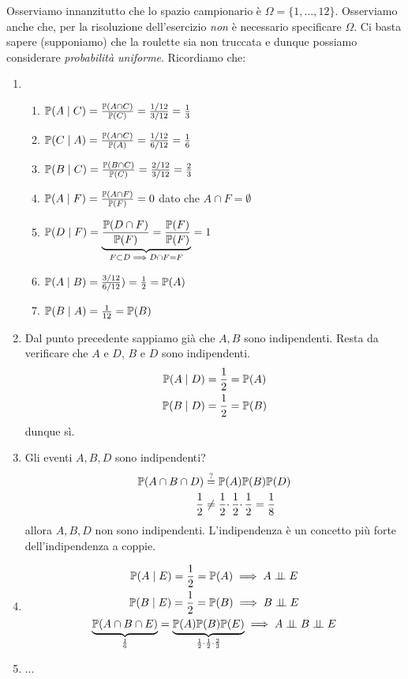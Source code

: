 Osserviamo innanzitutto che lo spazio campionario è $\Omega =\{1,\dots,12\}$. Osserviamo anche che, per la risoluzione dell'esercizio \textit{non} è necessario specificare $\Omega $. Ci basta sapere (supponiamo) che la roulette sia non truccata e dunque possiamo considerare \textit{probabilità uniforme}. Ricordiamo che:
\begin{enumerate}
	\item 
	\begin{enumerate}
		\item $\mathbb{P}( A\mid C) =\frac{\mathbb{P}( A\cap C)}{\mathbb{P}( C)} =\frac{1/12}{3/12} =\frac{1}{3}$
		\item $\mathbb{P}( C\mid A) =\frac{\mathbb{P}( A\cap C)}{\mathbb{P}( A)} =\frac{1/12}{6/12} =\frac{1}{6}$
		\item $\mathbb{P}( B\mid C) =\frac{\mathbb{P}( B\cap C)}{\mathbb{P}( C)} =\frac{2/12}{3/12} =\frac{2}{3}$
		\item $\mathbb{P}( A\mid F) =\frac{\mathbb{P}( A\cap F)}{\mathbb{P}( F)} =0$ dato che $A\cap F=\emptyset $
		\item $\mathbb{P}( D\mid F) =\underbrace{\frac{\mathbb{P}( D\cap F)}{\mathbb{P}( F)} =\frac{\mathbb{P}( F)}{\mathbb{P}( F)}}_{F\subset D\implies D\cap F=F} =1$
		\item $\mathbb{P}( A\mid B) =\frac{3/12}{6/12}) =\frac{1}{2} =\mathbb{P}( A)$
		\item $\mathbb{P}( B\mid A) =\frac{1}{12} =\mathbb{P}( B)$
	\end{enumerate}
	\item Dal punto precedente sappiamo già che $A,B$ sono indipendenti. Resta da verificare che $A$ e $D$, $B$ e $D$ sono indipendenti.
	\begin{gather*}
		\mathbb{P}( A\mid D) =\frac{1}{2} =\mathbb{P}( A)\\
		\mathbb{P}( B\mid D) =\frac{1}{2} =\mathbb{P}( B)
	\end{gather*}
	dunque sì.
	\item Gli eventi $A,B,D$ sono indipendenti?
	\begin{align*}
		\mathbb{P}( A\cap B\cap D) & \overset{?}{=} \mathbb{P}( A)\mathbb{P}( B)\mathbb{P}( D)\\
		\frac{1}{2} & \neq \frac{1}{2} \cdotp \frac{1}{2} \cdotp \frac{1}{2} =\frac{1}{8}
	\end{align*}
	allora $A,B,D$ non sono indipendenti. L'indipendenza è un concetto più forte dell'indipendenza a coppie.
	\item
	\begin{gather*}
		\PP( A\mid E) =\frac{1}{2} =\PP( A) \implies A\Bot E\\
		\PP( B\mid E) =\frac{1}{2} =\PP( B) \implies B\Bot E\\
		\underbrace{\PP( A\cap B\cap E)}_{\frac{1}{6}} =\underbrace{\PP( A)\PP( B)\PP( E)}_{\frac{1}{2} \cdotp \frac{1}{2} \cdotp \frac{2}{3}} \implies A\Bot B\Bot E
	\end{gather*}
	\item $\dots$
\end{enumerate}

